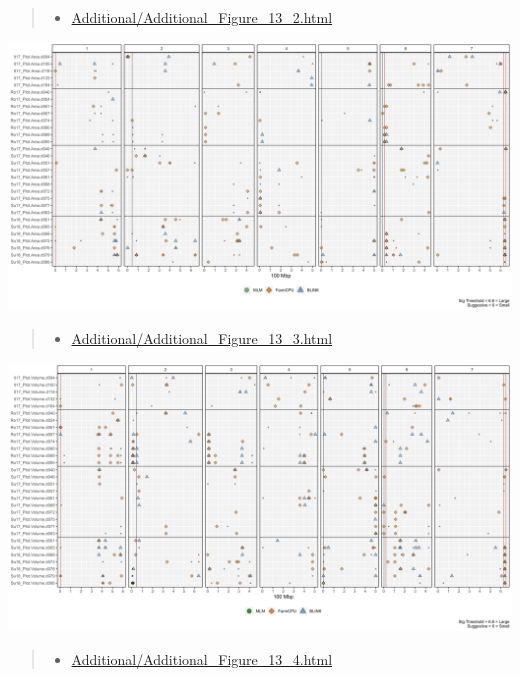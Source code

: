 \documentclass[
]{article}
\providecommand{\tightlist}{%
  \setlength{\itemsep}{0pt}\setlength{\parskip}{0pt}}
\begin{document}
\begin{quote}
\begin{itemize}
\tightlist
\item
  \href{https://derekmichaelwright.github.io/AGILE_LDP_UAV/Additional/Additional_Figure_13_2.html}{Additional/Additional\_Figure\_13\_2.html}
\end{itemize}
\end{quote}

\includegraphics{Additional/Additional_Figure_13_2.png}

\pagebreak

\begin{quote}
\begin{itemize}
\tightlist
\item
  \href{https://derekmichaelwright.github.io/AGILE_LDP_UAV/Additional/Additional_Figure_13_3.html}{Additional/Additional\_Figure\_13\_3.html}
\end{itemize}
\end{quote}

\includegraphics{Additional/Additional_Figure_13_3.png}

\begin{quote}
\begin{itemize}
\tightlist
\item
  \href{https://derekmichaelwright.github.io/AGILE_LDP_UAV/Additional/Additional_Figure_13_4.html}{Additional/Additional\_Figure\_13\_4.html}
\end{itemize}
\end{quote}
\end{document}
